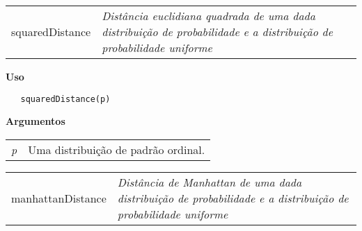 \hrulefill   

\begin{table}[!ht]
\begin{center}
\begin{tabularx}{\textwidth}{ X X}
\hspace{0.5cm} squaredDistance & \textit{Distância euclidiana quadrada de uma dada distribuição de probabilidade e a distribuição de probabilidade uniforme}\\
\end{tabularx}
\end{center}
\end{table} 

\vspace{-0.5cm}

\hrulefill  

\vspace{0.5cm}

\textbf{Uso}

\begin{lstlisting}
   squaredDistance(p)
\end{lstlisting}

\vspace{0.5cm}

\textbf{Argumentos}

\begin{table}[!ht]
\begin{center}
\begin{tabularx}{\textwidth}{X X}
\hspace{0.5cm} \textit{p} & Uma distribuição de padrão ordinal.\\
\end{tabularx}
\end{center}
\end{table} 

\newpage


\hrulefill   

\begin{table}[!ht]
\begin{center}
\begin{tabularx}{\textwidth}{ X X}
\hspace{0.5cm} manhattanDistance & \textit{Distância de Manhattan de uma dada distribuição de probabilidade e a distribuição de probabilidade uniforme}\\
\end{tabularx}
\end{center}
\end{table} 

